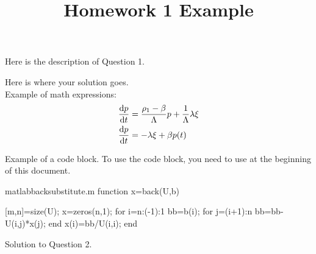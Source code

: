 


\duedate{\today}



\title{\vspace{-1cm} \textbf{Homework 1 Example} \vspace{-0.5cm}}
\date{}
\author{}
\inlinemaketitle

\begin{problem}[Question 1]

Here is the description of Question 1.

\end{problem}

\begin{solution}

Here is where your solution goes. \\

Example of math expressions:
\begin{align}
    \frac{\mathrm{d} p}{\mathrm{d} t} &= \frac{\rho_1-\beta}{\Lambda}p+
    \frac{1}{\Lambda}\lambda\xi \\
    \frac{\mathrm{d} p}{\mathrm{d} t} &= -\lambda\xi+\beta p(t)
\end{align}

Example of a code block. To use the code block, you need to use \verb|| at the beginning of this document.
\begin{ljminted}{matlab}{backsubstitute.m}
function x=back(U,b)

[m,n]=size(U);
x=zeros(n,1);
for i=n:(-1):1
    bb=b(i);
    for j=(i+1):n
        bb=bb-U(i,j)*x(j);
    end
    x(i)=bb/U(i,i);
end
\end{ljminted}

\end{solution}

\begin{problem}[Question 2]
\end{problem}

\begin{solution}
Solution to Question 2.
\end{solution}

